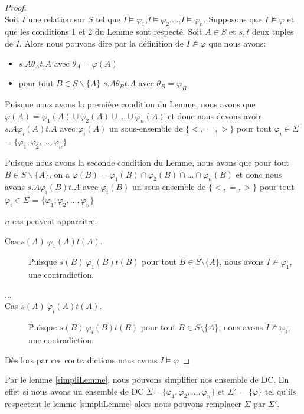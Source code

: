 \documentclass[letterpaper, 12pt]{report}
\theoremstyle{definition}
\begin{document}
\begin{proof}~\\
Soit $I$ une relation sur $S$ tel que $I \models \varphi_1$,$I \models \varphi_2$,...,$I \models \varphi_n$. Supposons que $I \not\models \varphi$ et que les conditions 1 et 2 du Lemme sont respecté. Soit $A \in S$ et $s,t$ deux tuples de $I$. Alors nous pouvons dire par la définition de $I \not\models \varphi$ que nous avons:

\begin{itemize} 
\item $s.A \theta_A t.A$ avec $\theta_A = \varphi(A)$
\item pour tout $B \in S \backslash \{A\}$ $s.A \theta_B t.A$ avec $\theta_B = \varphi_B$
\end{itemize}

Puisque nous avons la première condition du Lemme, nous avons que $\varphi(A) = \varphi_1(A) \cup \varphi_2(A) \cup ... \cup \varphi_n(A)$ et donc nous devons avoir $s.A \varphi_i(A) t.A$ avec $\varphi_i(A)$ un sous-ensemble de $\{<,=,>\}$ pour tout $\varphi_i \in \Sigma$ = $\{\varphi_1 , \varphi_2,..., \varphi_n \}$

Puisque nous avons la seconde condition du Lemme, nous avons que pour tout $B \in S \backslash \{A\}$, on a  $\varphi(B) = \varphi_1(B) \cap \varphi_2(B) \cap  ... \cap \varphi_n(B)$ et donc nous avons $s.A \varphi_i(B) t.A$ avec $\varphi_i(B)$ un sous-ensemble de $\{<,=,>\}$ pour tout $\varphi_i \in \Sigma$ = $\{\varphi_1 , \varphi_2,..., \varphi_n \}$

$n$ cas peuvent apparaitre:
\begin{description}
\item[Cas $s(A)\ \varphi_{1}(A) t(A)$.]
Puisque $s(B)\ \varphi_{1}(B) t(B)$ pour tout $B\in S\setminus\{A\}$,
nous avons $I\not\models\varphi_{1}$, une contradiction.
\item[...]
\item[Cas $s(A)\ \varphi_{i}(A) t(A)$.]
Puisque $s(B)\ \varphi_{i}(B) t(B)$ pour tout $B\in S\setminus\{A\}$,
nous avons $I\not\models\varphi_{i}$, une contradiction.
\end{description}

Dès lors par ces contradictions nous avons $I \models \varphi$
\end{proof}

Par le lemme \ref{simpliLemme}, nous pouvons simplifier nos ensemble de DC. En effet si nous avons un ensemble de DC $\Sigma$= $\{\varphi_1 , \varphi_2,..., \varphi_n \}$ et $\Sigma'$ = $\{ \varphi \}$ tel qu'ils respectent le lemme \ref{simpliLemme} alors nous pouvons remplacer $\Sigma$ par $\Sigma'$.\\
\end{document}
